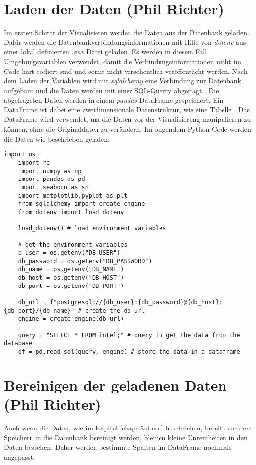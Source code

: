 \section{Laden der Daten (Phil Richter)}\label{sec:laden}
Im ersten Schritt der Visualisieren werden die Daten aus der Datenbank geladen. Dafür werden die Datenbankverbindungsinformationen mit Hilfe von \textit{dotenv}
\cite{noauthor_python-dotenv_nodate} aus einer lokal definierten \textit{.env} Datei geladen. Es werden in diesem Fall Umgebungsvariablen verwendet, damit die
Verbindungsinformationen nicht im Code hart codiert sind und somit nicht versehentlich veröffentlicht werden.
Nach dem Laden der Variablen wird mit \textit{sqlalchemy} \cite{noauthor_sqlalchemy_nodate} eine Verbindung zur Datenbank aufgebaut und die Daten werden mit einer
SQL-Querry abgefragt \cite{noauthor_orm_nodate}.
Die abgefrageten Daten werden in einem \textit{pandas} \cite{noauthor_pandas_nodate} DataFrame gespeichert. Ein DataFrame ist dabei eine zweidimensionale Datenstruktur,
wie eine Tabelle \cite{noauthor_pandasdataframe_nodate}. Das DataFrame wird verwendet, um die Daten vor der Visualisierung manipulieren zu können, ohne die Originaldaten zu verändern.
Im folgendem Python-Code werden die Daten wie beschrieben geladen:

\lstset{
	breaklines=true,         
	breakatwhitespace=false,
	basicstyle=\ttfamily,    
}

\begin{lstlisting}[caption={\texttt{load data from the database}},captionpos=b]
    import os
    import re
    import numpy as np
    import pandas as pd
    import seaborn as sn
    import matplotlib.pyplot as plt
    from sqlalchemy import create_engine
    from dotenv import load_dotenv

    load_dotenv() # load environment variables

    # get the environment variables
    b_user = os.getenv("DB_USER")
    db_password = os.getenv("DB_PASSWORD")
    db_name = os.getenv("DB_NAME")
    db_host = os.getenv("DB_HOST")
    db_port = os.getenv("DB_PORT")

    db_url = f"postgresql://{db_user}:{db_password}@{db_host}:{db_port}/{db_name}" # create the db url
    engine = create_engine(db_url)

    query = "SELECT * FROM intel;" # query to get the data from the database
    df = pd.read_sql(query, engine) # store the data in a dataframe
\end{lstlisting}

\section{Bereinigen der geladenen Daten (Phil Richter)}\label{sec:bereinigen}
Auch wenn die Daten, wie im Kapitel \ref{chap:säubern} beschrieben, bereits vor dem Speichern in die Datenbank bereinigt werden, bleinen kleine
Unreinheiten in den Daten bestehen. Daher werden bestimmte Spalten im DataFrame nochmals angepasst.


